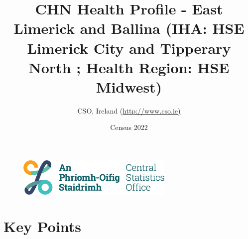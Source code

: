 \documentclass{article}
\title{CHN Health Profile - East Limerick and Ballina (IHA: HSE Limerick City and Tipperary North ;  Health Region: HSE Midwest) }
\date{Census 2022}
\author{CSO, Ireland  (\url{http://www.cso.ie)}}
\begin{document}


\begin{figure}
	\centering
\includegraphics[width =75mm]{../figures/CSO_Logo.png}
\end{figure}

				 
		   
						  
														  
																																													
												 
			 
\maketitle
					
													   
				 
						 
																																																																											   
				 
				  
  \pagebreak
    	    \tableofcontents

\pagebreak


\section{Key Points}
\end{document}
